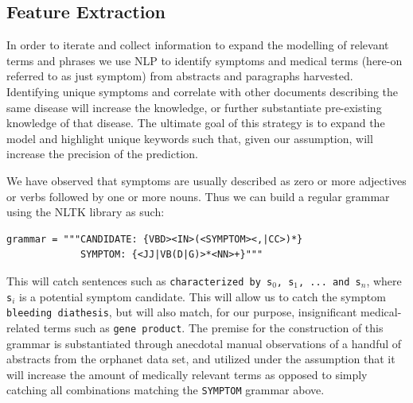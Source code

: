 \documentclass[10pt,letterpaper,final]{article}
\begin{document}




\subsection{Feature Extraction}
In order to iterate and collect information to expand the modelling of
relevant terms and phrases we use NLP to identify symptoms and medical
terms (here-on referred to as just symptom) from abstracts and
paragraphs harvested. Identifying unique symptoms and correlate with
other documents describing the same disease will increase the knowledge,
or further substantiate pre-existing knowledge of that disease. The
ultimate goal of this strategy is to expand the model and highlight
unique keywords such that, given our assumption, will increase the
precision of the prediction.

We have observed that symptoms are usually described as zero or more
adjectives or verbs followed by one or more nouns.
Thus we can build a regular grammar using the NLTK library as such:
\begin{lstlisting}
grammar = """CANDIDATE: {VBD><IN>(<SYMPTOM><,|CC>)*}
             SYMPTOM: {<JJ|VB(D|G)>*<NN>+}"""
\end{lstlisting}
This will catch sentences such as \texttt{characterized by s$_{0}$,
s$_{1}$, ... and s$_{n}$}, where \texttt{s$_{i}$} is a potential symptom
candidate.
This will allow us to catch the symptom \texttt{bleeding diathesis}, but
will also match, for our purpose, insignificant medical-related terms
such as \texttt{gene product}.
The premise for the construction of this grammar is substantiated
through anecdotal manual observations of a handful of abstracts from the
orphanet data set, and utilized under the assumption that it will
increase the amount of medically relevant terms as opposed to simply
catching all combinations matching the \texttt{SYMPTOM} grammar above.
\end{document}
